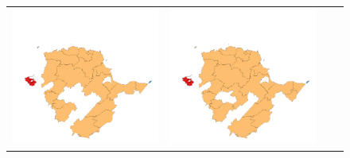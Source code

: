 \begin{figure}[p]
\begin{tabularx}{1\textwidth}{XXXX}
\includegraphics[width=1\linewidth]{images/ch6/contig/15}&
\includegraphics[width=1\linewidth]{images/ch6/contig/16} \\

\end{tabularx}
\end{figure}
